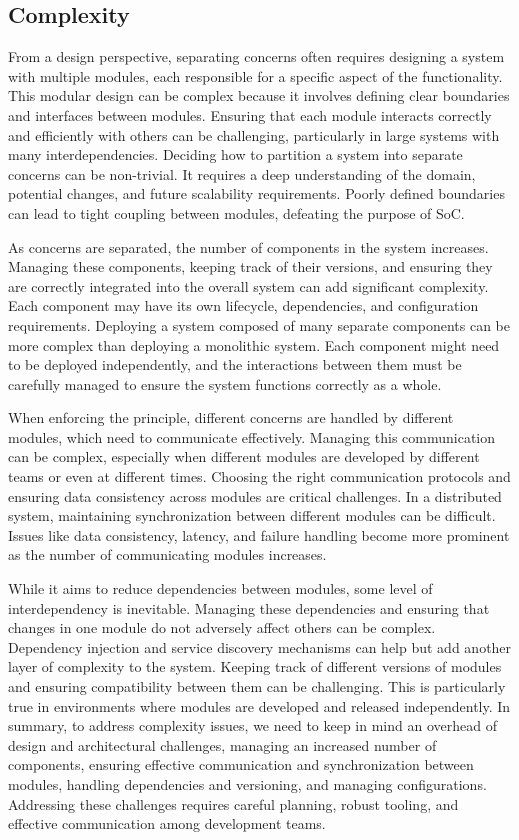 \subsection{Complexity}
From a design perspective, separating concerns often requires designing a system with multiple modules, each responsible for a specific aspect of the functionality.
This modular design can be complex because it involves defining clear boundaries and interfaces between modules.
Ensuring that each module interacts correctly and efficiently with others can be challenging, particularly in large systems with many interdependencies.
Deciding how to partition a system into separate concerns can be non-trivial. It requires a deep understanding of the domain, potential changes, and future scalability requirements. Poorly defined boundaries can lead to tight coupling between modules, defeating the purpose of SoC.
\par
As concerns are separated, the number of components in the system increases. Managing these components, keeping track of their versions, and ensuring they are correctly integrated into the overall system can add significant complexity. Each component may have its own lifecycle, dependencies, and configuration requirements.
Deploying a system composed of many separate components can be more complex than deploying a monolithic system. Each component might need to be deployed independently, and the interactions between them must be carefully managed to ensure the system functions correctly as a whole.
\par
When enforcing the principle, different concerns are handled by different modules, which need to communicate effectively. Managing this communication can be complex, especially when different modules are developed by different teams or even at different times. Choosing the right communication protocols and ensuring data consistency across modules are critical challenges.
In a distributed system, maintaining synchronization between different modules can be difficult. Issues like data consistency, latency, and failure handling become more prominent as the number of communicating modules increases.
\par
While it aims to reduce dependencies between modules, some level of interdependency is inevitable. Managing these dependencies and ensuring that changes in one module do not adversely affect others can be complex. Dependency injection and service discovery mechanisms can help but add another layer of complexity to the system.
Keeping track of different versions of modules and ensuring compatibility between them can be challenging. This is particularly true in environments where modules are developed and released independently.
In summary, to address complexity issues, we need to keep in mind an overhead of design and architectural challenges, managing an increased number of components, ensuring effective communication and synchronization between modules, handling dependencies and versioning, and managing configurations. Addressing these challenges requires careful planning, robust tooling, and effective communication among development teams.

